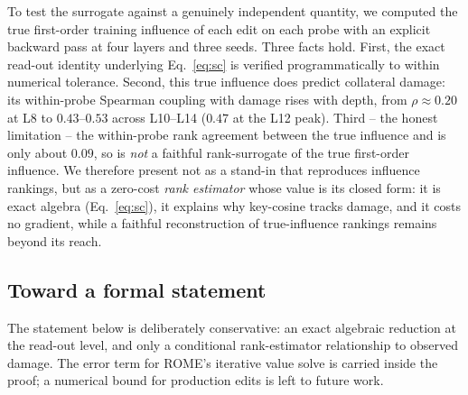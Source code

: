 To test the surrogate against a genuinely independent quantity, we computed the
true first-order training influence of each edit on each probe with an explicit
backward pass at four layers and three seeds. Three facts hold.
First, the exact read-out identity underlying Eq.~\ref{eq:sc} is verified
programmatically to within numerical tolerance.
Second, this true influence does predict collateral damage: its within-probe
Spearman coupling with damage rises with depth, from $\rho\approx0.20$ at L8 to
$0.43$--$0.53$ across L10--L14 ($0.47$ at the L12 peak).
Third -- the honest limitation -- the within-probe rank agreement between the
true influence and \SxC{} is only about $0.09$, so \SxC{} is \emph{not} a
faithful rank-surrogate of the true first-order influence. We therefore present
\SxC{} not as a stand-in that reproduces influence rankings, but as a zero-cost
\emph{rank estimator} whose value is its closed form: it is exact algebra
(Eq.~\ref{eq:sc}), it explains why key-cosine tracks damage, and it costs no
gradient, while a faithful reconstruction of true-influence rankings remains
beyond its reach.

\subsection{Toward a formal statement}
\label{sec:formal}
The statement below is deliberately conservative: an exact algebraic
reduction at the read-out level, and only a conditional rank-estimator
relationship to observed damage. The error term for ROME's iterative value
solve is carried inside the proof; a numerical bound for production edits is
left to future work.


